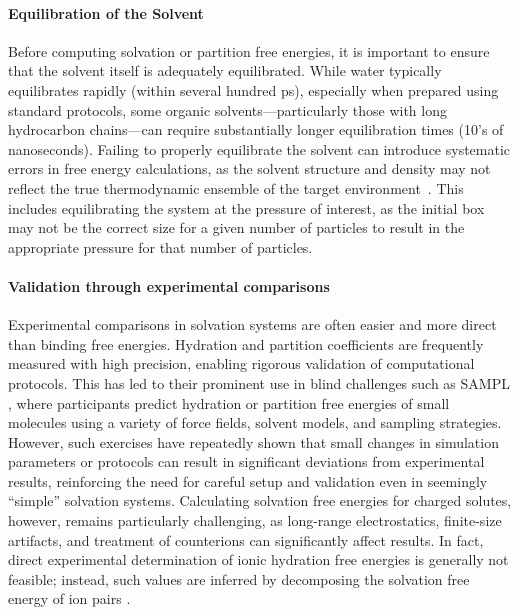 \documentclass[9pt,bestpractices]{livecoms}
\begin{document}
\paragraph{Equilibration of the Solvent}
Before computing solvation or partition free energies, it is important to ensure that the solvent itself is adequately equilibrated. While water typically equilibrates rapidly (within several hundred ps), especially when prepared using standard protocols, some organic solvents—particularly those with long hydrocarbon chains—can require substantially longer equilibration times\cite{fan2021sampl7} (10's of nanoseconds). Failing to properly equilibrate the solvent can introduce systematic errors in free energy calculations, as the solvent structure and density may not reflect the true thermodynamic ensemble of the target environment~\cite{zhang2017solventmodel}. This includes equilibrating the system at the pressure of interest, as the initial box may not be the correct size for a given number of particles to result in the appropriate pressure for that number of particles. 

\paragraph{Validation through experimental comparisons}  
Experimental comparisons in solvation systems are often easier and more direct than binding free energies. Hydration and partition coefficients are frequently measured with high precision, enabling rigorous validation of computational protocols. This has led to their prominent use in blind challenges such as SAMPL \cite{skillman2012sampl3, mobley2014sampl4, bergazin2021sampl7}, where participants predict hydration or partition free energies of small molecules using a variety of force fields, solvent models, and sampling strategies. However, such exercises have repeatedly shown that small changes in simulation parameters or protocols can result in significant deviations from experimental results, reinforcing the need for careful setup and validation even in seemingly ``simple'' solvation systems.  Calculating solvation free energies for charged solutes, however, remains particularly challenging, as long-range electrostatics, finite-size artifacts, and treatment of counterions can significantly affect results. In fact, direct experimental determination of ionic hydration free energies is generally not feasible; instead, such values are inferred by decomposing the solvation free energy of ion pairs \cite{mobley2014freesolv}. 
\end{document}
